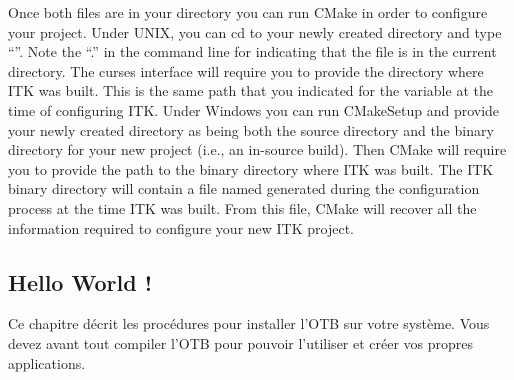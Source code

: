 Once both files are in your directory you can run CMake in order to configure
your project. Under UNIX, you can cd to your newly created directory
and type ``''. Note the ``.'' in the command line for indicating
that the  file is in the current directory. The
curses interface will require you to provide the directory where ITK
was built. This is the same path that you indicated for the
 variable at the time of configuring ITK. Under
Windows you can run CMakeSetup and provide your newly created
directory as being both the source directory and the binary directory for
your new project (i.e., an in-source build). Then CMake will require you to
provide the path to the binary directory where ITK was built. The ITK binary
directory will contain a file named  generated during the
configuration process at the time ITK was built.  From this file, CMake will
recover all the information required to configure your new ITK project.

\subsection{Hello World !}
\label{sec:HelloWorldITK}



Ce chapitre d\'{e}crit les proc\'{e}dures pour installer l'OTB sur votre syst\`{e}me.
Vous devez avant tout compiler l'OTB pour pouvoir l'utiliser et cr\'{e}er vos propres applications.


